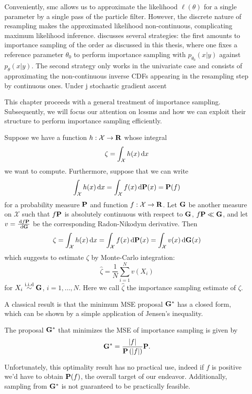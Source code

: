 Conveniently, \gls{smc} allows us to approximate the likelihood $\ell(\theta)$ for a single parameter by a single pass of the particle filter. However, the discrete nature of resampling makes the approximated likelihood non-continuous, complicating maximum likelihood inference. \cite[Chapter 14.3]{Chopin2020Introduction} discusses several strategies: the first amounts to importance sampling of the order as discussed in this thesis, where one fixes a reference parameter $\theta_{0}$ to perform importance sampling with $p_{\theta_{0}}(x|y)$ against $p_{\theta}(x|y)$. The second strategy only works in the univariate case and consists of approximating the non-continuous inverse CDFs appearing in the resampling step by continuous ones. Under j stochastic gradient ascent  

This chapter proceeds with a general treatment of importance sampling. Subsequently, we will focus our attention on \glspl{lcssm} and how we can exploit their structure to perform importance sampling efficiently. 

Suppose we have a function $h: \mathcal X \to \R$ whose integral $$\zeta = \int_{\mathcal X} h(x) \d x$$ we want to compute.
Furthermore, suppose that we can write
$$
    \int_{\mathcal X} h(x) \d x = \int_{\mathcal X} f(x) \d \P(x) = \P (f)
$$
for a probability measure $\P$ and function $f: \mathcal X \to \R$.
Let $\G$ be another measure on $\mathcal X$ such that $f\P$ is absolutely continuous with respect to $\G$, $f\P \ll \G$, and let $v = \frac{\d f\P}{\d\G}$ be the corresponding Radon-Nikodym derivative. Then
$$
    \zeta = \int_{\mathcal X} h(x) \d x = \int_{\mathcal X} f(x) \d \P(x) = \int_{\mathcal X} v(x)\d\G(x)
$$
which suggests to estimate $\zeta$ by Monte-Carlo integration: $$\hat \zeta = \frac 1 N \sum_{i=1}^{N} v(X_i)$$ for $X_i \iid \G$, $i = 1, \dots, N$. Here we call $\hat \zeta$ the importance sampling estimate of $\zeta$.

A classical result is that the minimum MSE proposal $\G^\ast$ has a closed form, which can be shown by a simple application of Jensen's inequality. 
\begin{proposition}
    \label{prop:minimum_MSE_IS}
    The proposal $\G^{\ast}$ that minimizes the MSE of importance sampling is given by
    $$
    \G^{\ast}  = \frac{\lvert f \rvert}{\P\left(\lvert f \rvert \right)} \P.
    $$
\end{proposition}
Unfortunately, this optimality result has no practical use, indeed if $f$ is positive we'd have to obtain $\P(f)$, the overall target of our endeavor. Additionally, sampling from $\G^{\ast}$ is not guaranteed to be practically feasible. 

